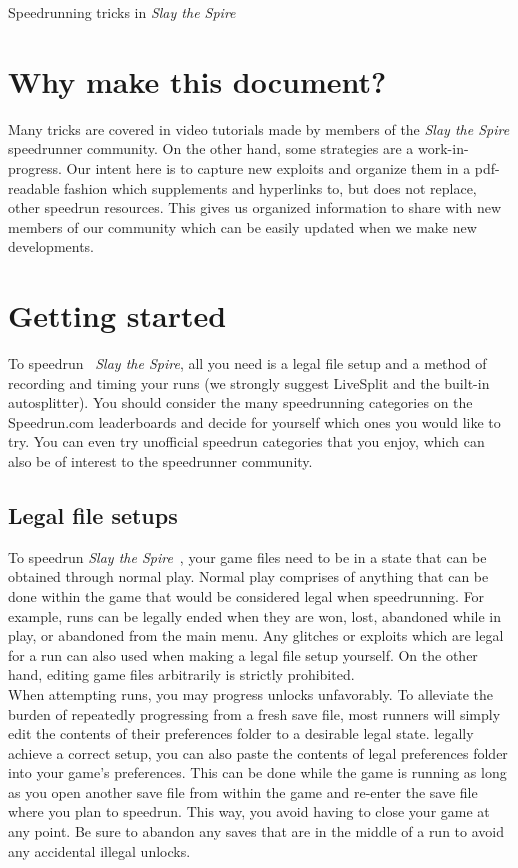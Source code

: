 \documentclass[12pt]{amsart}
\newcommand{\sts}{\textit{Slay the Spire}}
\begin{document}
\begin{center}
    \Huge Speedrunning tricks in \textit{Slay the Spire}
\end{center}

\thispagestyle{plain}

\tableofcontents

\section{Why make this document? }
Many tricks are covered in video tutorials made by members of the \textit{Slay the Spire} speedrunner community.  
On the other hand, some strategies are a work-in-progress. 
Our intent here is to capture new exploits and organize them in a pdf-readable fashion which supplements and hyperlinks to, but does not replace, other speedrun resources.  
This gives us organized information to share with new members of our community which can be easily updated when we make new developments. 
\cite{ForgottenArbiterMoreGlitches}


\section{Getting started}
To speedrun ~\sts, all you need is a legal file setup and a method of recording and timing your runs (we strongly suggest LiveSplit and the built-in autosplitter).  
You should consider the many speedrunning categories on the \textrm{Speedrun.com} leaderboards \cite{SlayTheSpireLeaderboards} and decide for yourself which ones you would like to try.  
You can even try unofficial speedrun categories that you enjoy, which can also be of interest to the speedrunner community.  
\subsection{Legal file setups}
To speedrun \sts~, your game files need to be in a state that can be obtained through normal play.  
Normal play comprises of anything that can be done within the game that would be considered legal when speedrunning.  
For example, runs can be legally ended when they are won, lost, abandoned while in play, or abandoned from the main menu.  
Any glitches or exploits which are legal for a run can also used when making a legal file setup yourself.  
On the other hand, editing game files arbitrarily is strictly prohibited.  
\\

When attempting runs, you may progress unlocks unfavorably.  
To alleviate the burden of repeatedly progressing from a fresh save file, most runners will simply edit the contents of their \textrm{preferences} folder to a desirable legal state.  
 legally achieve a correct setup, you can also paste the contents of legal \textrm{preferences} folder into your game's \textrm{preferences}.  
This can be done while the game is running as long as you open another save file from within the game and re-enter the save file where you plan to speedrun.  
This way, you avoid having to close your game at any point.  
Be sure to abandon any saves that are in the middle of a run to avoid any accidental illegal unlocks.  \\
\end{document}
